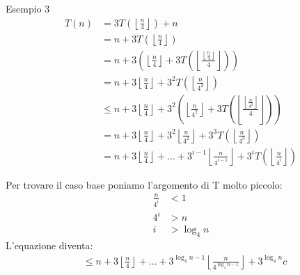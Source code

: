 \documentclass[a4paper]{article}
\begin{document}
\begin{examplebox}{Esempio 3}
  \[
    \begin{aligned}
      T(n) & = 3T \left( \left\lfloor \frac{n}{4} \right\rfloor \right) + n\\
           & = n + 3T \left( \left\lfloor \frac{n}{4} \right\rfloor \right)\\
           & = n + 3 \left( \left\lfloor \frac{n}{4} \right\rfloor + 3T
           \left( \left\lfloor \frac{\left\lfloor \frac{n}{4} \right\rfloor}{4} \right\rfloor
           \right)  \right)\\
           & = n + 3 \left\lfloor \frac{n}{4} \right\rfloor + 3^2 T
           \left( \left\lfloor \frac{n}{4^2} \right\rfloor \right)\\
           & \le n + 3 \left\lfloor \frac{n}{4} \right\rfloor + 3^2
           \left( \left\lfloor \frac{n}{4^2} \right\rfloor + 3T \left(
           \left\lfloor \frac{\left\lfloor \frac{n}{4^2} \right\rfloor}{4} \right\rfloor
           \right)  \right) \\
           & = n + 3 \left\lfloor \frac{n}{4} \right\rfloor + 3^2
           \left\lfloor \frac{n}{4^2} \right\rfloor + 3^3 T
           \left( \left\lfloor \frac{n}{4^3} \right\rfloor \right) \\
           & = n + 3 \left\lfloor \frac{n}{4} \right\rfloor + \ldots + 3^{i-1}
           \left\lfloor \frac{n}{4^{i-1}} \right\rfloor + 3^i T
           \left( \left\lfloor \frac{n}{4^i} \right\rfloor \right)
    \end{aligned}
  \]


  Per trovare il caso base poniamo l'argomento di T molto piccolo:
  \[
    \begin{aligned}
      \frac{n}{4^i} & < 1\\
      4^i & > n\\
      i & > \log_4 n
    \end{aligned}
  \]
  L'equazione diventa:
  \[
    \begin{aligned}
      & \le n + 3 \left\lfloor \frac{n}{4} \right\rfloor + \ldots + 3^{\log_4 n - 1}
      \left\lfloor \frac{n}{4^{\log_4 n - 1}} \right\rfloor + 3^{\log_4 n} c\\
    \end{aligned}
  \]



\end{examplebox}
\end{document}
